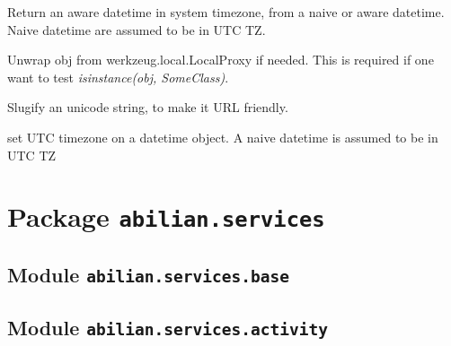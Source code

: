 \documentclass[a4paper,12pt,english]{sphinxmanual}
\begin{document}
\begin{fulllineitems}
\label{api:abilian.core.util.local_dt}
Return an aware datetime in system timezone, from a naive or aware
datetime. Naive datetime are assumed to be in UTC TZ.

\end{fulllineitems}


\begin{fulllineitems}
\label{api:abilian.core.util.noproxy}
Unwrap obj from werkzeug.local.LocalProxy if needed. This is required if
one want to test \emph{isinstance(obj, SomeClass)}.

\end{fulllineitems}


\begin{fulllineitems}
\label{api:abilian.core.util.slugify}
Slugify an unicode string, to make it URL friendly.

\end{fulllineitems}


\begin{fulllineitems}
\label{api:abilian.core.util.utc_dt}
set UTC timezone on a datetime object. A naive datetime is assumed to be
in UTC TZ

\end{fulllineitems}



\section{Package \texttt{abilian.services}}
\label{api:package-abilian-services}

\subsection{Module \texttt{abilian.services.base}}
\label{api:module-abilian-services-base}

\subsection{Module \texttt{abilian.services.activity}}
\label{api:module-abilian-services-activity}
\end{document}
